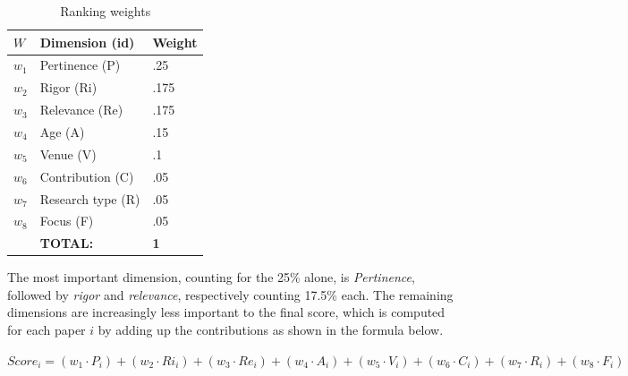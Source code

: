 \documentclass[final,5p,times,twocolumn]{elsarticle}
\begin{document}
\begin{table}[H]
\renewcommand{\arraystretch}{1.3}
\caption{Ranking weights }
\label{tab:ms:score-weights}
\centering
\scriptsize \begin{tabular}{|l|l|l|}
\hline 
\hline 
$W$ & Dimension (id) & Weight \\
\hline 
$w_1$ & Pertinence (P) & .25 \\
$w_2$ &Rigor (Ri) & .175 \\
$w_3$ &Relevance (Re) & .175 \\
$w_4$ &Age (A)   & .15 \\
$w_5$ &Venue (V) & .1 \\
$w_6$ &Contribution (C) & .05 \\
$w_7$ &Research type (R) & .05 \\
$w_8$ &Focus (F) & .05 \\
\hline 
\hline 
&\textbf{TOTAL:} & \textbf{1} \\

 \hline  \hline
 \end{tabular}
 \end{table}

The most important dimension, counting for the 25\% alone, is \textit{Pertinence}, followed by \textit{rigor} and \textit{relevance}, respectively counting 17.5\% each.  The remaining dimensions are increasingly less important to the final score, which is computed for each paper $i$ by adding up the contributions as shown in the formula below.

\scriptsize  $Score_i = (w_1\cdot P_i) + (w_2 \cdot Ri_i) + (w_3 \cdot Re_i) + (w_4 \cdot A_i) + (w_5 \cdot V_i) + (w_6 \cdot C_i)+ (w_7 \cdot R_i) + (w_8 \cdot F_i)  $
\small 
\end{document}
